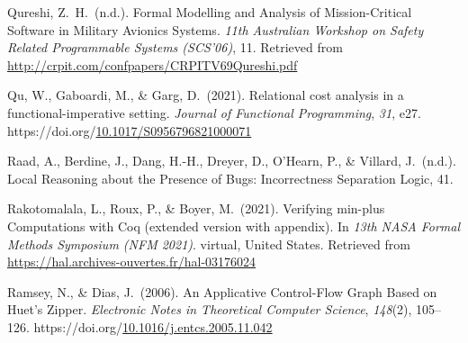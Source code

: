 \documentclass[12pt,twoside]{article}
\begin{document}
{\begin{thebibliography}{1079}
\mdbibitemlabel{}Qureshi, Z.~H.~(n.d.). Formal Modelling and Analysis of Mission-Critical Software in Military Avionics Systems. \emph{11th Australian Workshop on Safety Related Programmable Systems (SCS’06)}, 11. Retrieved from \href{http://crpit.com/confpapers/CRPITV69Qureshi.pdf}{{\ttfamily http://\hspace{0pt}crpit.\hspace{0pt}com/\hspace{0pt}confpapers/\hspace{0pt}CRPITV69Qureshi.\hspace{0pt}pdf}}%

\mdbibitemlabel{}Qu, W., Gaboardi, M., \& Garg, D.~(2021). Relational cost analysis in a functional-imperative setting. \emph{Journal of Functional Programming}, \emph{31}, e27. https://doi.org/\href{https://dx.doi.org/10.1017/S0956796821000071}{10.1017/S0956796821000071}%

\mdbibitemlabel{}Raad, A., Berdine, J., Dang, H.-H., Dreyer, D., O’Hearn, P., \& Villard, J.~(n.d.). Local Reasoning about the Presence of Bugs: Incorrectness Separation Logic, 41.%

\mdbibitemlabel{}Rakotomalala, L., Roux, P., \& Boyer, M.~(2021). Verifying min-plus Computations with Coq (extended version with appendix). In \emph{13th NASA Formal Methods Symposium (NFM 2021)}. virtual, United States. Retrieved from \href{https://hal.archives-ouvertes.fr/hal-03176024}{{\ttfamily https://\hspace{0pt}hal.\hspace{0pt}archives-\hspace{0pt}ouvertes.\hspace{0pt}fr/\hspace{0pt}hal-\hspace{0pt}03176024}}%

\mdbibitemlabel{}Ramsey, N., \& Dias, J.~(2006). An Applicative Control-Flow Graph Based on Huet’s Zipper. \emph{Electronic Notes in Theoretical Computer Science}, \emph{148}(2), 105–126. https://doi.org/\href{https://dx.doi.org/10.1016/j.entcs.2005.11.042}{10.1016/j.entcs.2005.11.042}%


\end{thebibliography}}
\end{document}
